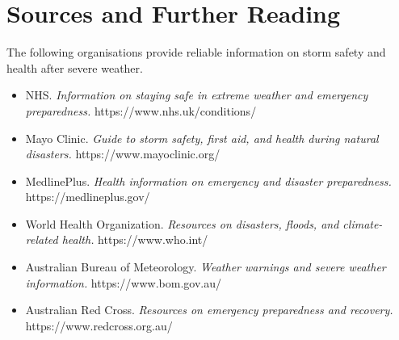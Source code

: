 \section*{Sources and Further Reading}
The following organisations provide reliable information on storm safety and health after severe weather.

\begin{itemize}
    \item NHS. \textit{Information on staying safe in extreme weather and emergency preparedness.} https://www.nhs.uk/conditions/
    \item Mayo Clinic. \textit{Guide to storm safety, first aid, and health during natural disasters.} https://www.mayoclinic.org/
    \item MedlinePlus. \textit{Health information on emergency and disaster preparedness.} https://medlineplus.gov/
    \item World Health Organization. \textit{Resources on disasters, floods, and climate-related health.} https://www.who.int/
    \item Australian Bureau of Meteorology. \textit{Weather warnings and severe weather information.} https://www.bom.gov.au/
    \item Australian Red Cross. \textit{Resources on emergency preparedness and recovery.} https://www.redcross.org.au/
\end{itemize}
